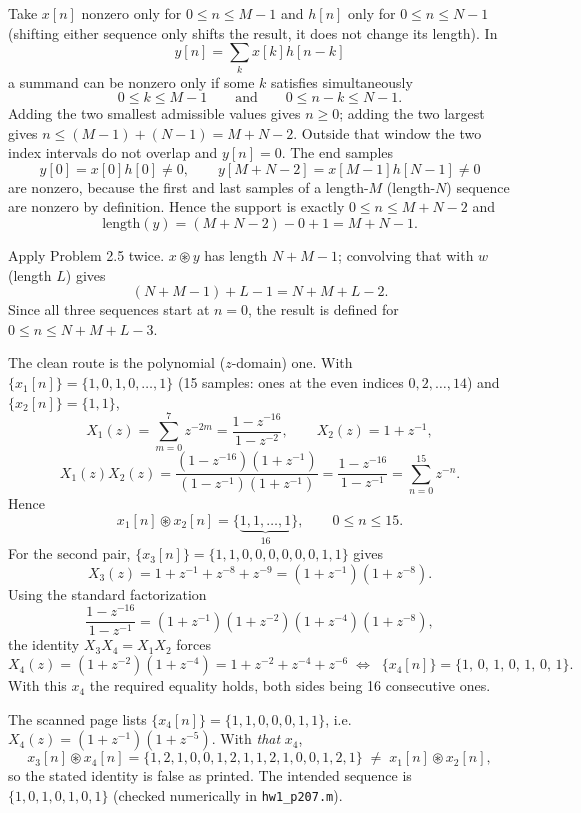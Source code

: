 
Take $x[n]$ nonzero only for $0\le n\le M-1$ and $h[n]$ only for $0\le n\le N-1$ (shifting
either sequence only shifts the result, it does not change its length). In
\[
y[n]=\sum_{k}x[k]h[n-k]
\]
a summand can be nonzero only if some $k$ satisfies simultaneously
\[
0\le k\le M-1 \qquad\text{and}\qquad 0\le n-k\le N-1 .
\]
Adding the two smallest admissible values gives $n\ge 0$; adding the two largest gives
$n\le (M-1)+(N-1)=M+N-2$. Outside that window the two index intervals do not overlap and
$y[n]=0$. The end samples
\[
y[0]=x[0]h[0]\ne 0,\qquad y[M+N-2]=x[M-1]h[N-1]\ne 0
\]
are nonzero, because the first and last samples of a length-$M$ (length-$N$) sequence are
nonzero by definition. Hence the support is exactly $0\le n\le M+N-2$ and
\[
\boxed{\;\text{length}(y)=(M+N-2)-0+1=M+N-1.\;}
\]


Apply Problem 2.5 twice. $x\circledast y$ has length $N+M-1$; convolving that with $w$
(length $L$) gives
\[
\boxed{\;(N+M-1)+L-1=N+M+L-2 .\;}
\]
Since all three sequences start at $n=0$, the result is defined for $0\le n\le N+M+L-3$.


The clean route is the polynomial ($z$-domain) one. With
$\{x_1[n]\}=\{1,0,1,0,\dots,1\}$ (15 samples: ones at the even indices $0,2,\dots,14$) and
$\{x_2[n]\}=\{1,1\}$,
\[
X_1(z)=\sum_{m=0}^{7}z^{-2m}=\frac{1-z^{-16}}{1-z^{-2}},\qquad X_2(z)=1+z^{-1},
\]
\[
X_1(z)X_2(z)=\frac{(1-z^{-16})(1+z^{-1})}{(1-z^{-1})(1+z^{-1})}
            =\frac{1-z^{-16}}{1-z^{-1}}=\sum_{n=0}^{15}z^{-n}.
\]
Hence
\[
\boxed{\;x_1[n]\circledast x_2[n]=\{\underbrace{1,1,\dots,1}_{16}\},\qquad 0\le n\le 15.\;}
\]
For the second pair, $\{x_3[n]\}=\{1,1,0,0,0,0,0,0,1,1\}$ gives
\[
X_3(z)=1+z^{-1}+z^{-8}+z^{-9}=(1+z^{-1})(1+z^{-8}).
\]
Using the standard factorization
\[
\frac{1-z^{-16}}{1-z^{-1}}=(1+z^{-1})(1+z^{-2})(1+z^{-4})(1+z^{-8}),
\]
the identity $X_3X_4=X_1X_2$ forces
\[
X_4(z)=(1+z^{-2})(1+z^{-4})=1+z^{-2}+z^{-4}+z^{-6}
\;\Longleftrightarrow\;
\boxed{\;\{x_4[n]\}=\{1,\,0,\,1,\,0,\,1,\,0,\,1\}.\;}
\]
With this $x_4$ the required equality holds, both sides being 16 consecutive ones.

\smallskip
\Mis The scanned page lists $\{x_4[n]\}=\{1,1,0,0,0,1,1\}$, i.e.\
$X_4(z)=(1+z^{-1})(1+z^{-5})$. With \emph{that} $x_4$,
\[
x_3[n]\circledast x_4[n]=\{1,2,1,0,0,1,2,1,1,2,1,0,0,1,2,1\}\;\ne\;x_1[n]\circledast x_2[n],
\]
so the stated identity is false as printed. The intended sequence is
$\{1,0,1,0,1,0,1\}$ (checked numerically in \texttt{hw1\_p207.m}).


